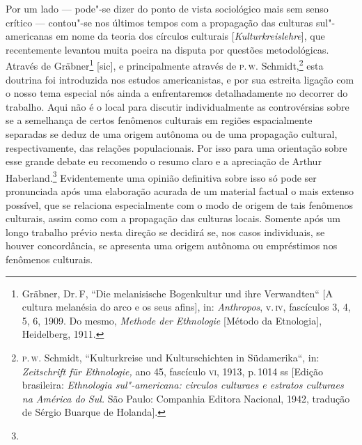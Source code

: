 Por um lado --- pode"-se dizer do ponto de vista sociológico mais sem
senso crítico --- contou"-se nos últimos tempos com a propagação das
culturas sul"-americanas em nome da teoria dos círculos culturais
{[}\textit{Kulturkreislehre}{]}, que recentemente levantou muita poeira na
disputa por questões metodológicas. Através de Gräbner\footnote{Gräbner,
  Dr.\,F, ``Die melanisische Bogenkultur und ihre Verwandten`` {[}A
  cultura melanésia do arco e os seus afins{]}, in: \textit{Anthropos}, v.\,\textsc{iv}, fascículos 3, 4, 5, 6, 1909. Do mesmo, \textit{Methode der
  Ethnologie} {[}Método da Etnologia{]}, Heidelberg, 1911.} {[}sic{]}, e
principalmente através de \textsc{p}.\,\textsc{w}. Schmidt,\footnote{\textsc{p}.\,\textsc{w}. Schmidt,
  ``Kulturkreise und Kulturschichten in Südamerika``, in:
  \textit{Zeitschrift für Ethnologie,} ano 45, fascículo \textsc{vi}, 1913, p.\,1014
  ss {[}Edição brasileira: \textit{Ethnologia sul"-americana: circulos
  culturaes e estratos culturaes na América do Sul.} São Paulo:
  Companhia Editora Nacional, 1942, tradução de Sérgio Buarque de
  Holanda{]}.} esta doutrina foi introduzida nos estudos
americanistas, e por sua estreita ligação com o nosso tema especial nós
ainda a enfrentaremos detalhadamente no decorrer do trabalho. Aqui não é
o local para discutir individualmente as controvérsias sobre se a
semelhança de certos fenômenos culturais em regiões espacialmente
separadas se deduz de uma origem autônoma ou de uma propagação
cultural, respectivamente, das relações populacionais. Por isso para uma
orientação sobre esse grande debate eu recomendo o resumo claro e a
apreciação de Arthur Haberland.\footnote{} Evidentemente uma opinião
definitiva sobre isso só pode ser pronunciada após uma elaboração
acurada de um material factual o mais extenso possível, que se
relaciona especialmente com o modo de origem de tais fenômenos
culturais, assim como com a propagação das culturas locais. Somente após
um longo trabalho prévio nesta direção se decidirá se, nos casos
individuais, se houver concordância, se apresenta uma origem autônoma ou
empréstimos nos fenômenos culturais.

